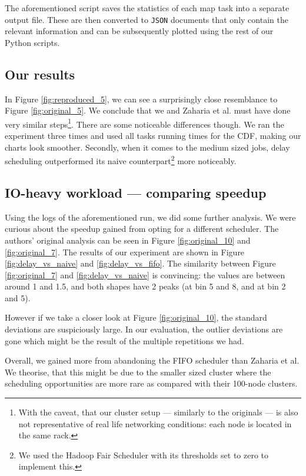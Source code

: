 The aforementioned script saves the statistics of each map task into a separate output file. These are then converted to \texttt{JSON} documents that only contain the relevant information and can be subsequently plotted using the rest of our Python scripts. 

\subsection{Our results}



In Figure \ref{fig:reproduced_5}, we can see a surprisingly close resemblance to Figure \ref{fig:original_5}. We conclude that we and Zaharia et al. \cite{ds} must have done very similar steps\footnote{With the caveat, that our cluster setup --- similarly to the originals --- is also not representative of real life networking conditions: each node is located in the same rack.}. There are some noticeable differences though. We ran the experiment three times and used all tasks running times for the CDF, making our charts look smoother. Secondly, when it comes to the medium sized jobs, delay scheduling outperformed its naive counterpart\footnote{We used the Hadoop Fair Scheduler with its thresholds set to zero to implement this.} more noticeably.

\subsection{IO-heavy workload --- comparing speedup}

Using the logs of the aforementioned run, we did some further analysis. We were curious about the speedup gained from opting for a different scheduler. The authors' original analysis can be seen in Figure \ref{fig:original_10} and \ref{fig:original_7}. The results of our experiment are shown in Figure  \ref{fig:delay_vs_naive} and \ref{fig:delay_vs_fifo}. The similarity between Figure \ref{fig:original_7} and \ref{fig:delay_vs_naive} is convincing: the values are between around 1 and 1.5, and both shapes have 2 peaks (at bin 5 and 8, and at bin 2 and 5).







However if we take a closer look at Figure \ref{fig:original_10}, the standard deviations are suspiciously large. In our evaluation, the outlier deviations are gone which might be the result of the multiple repetitions we had.

Overall, we gained more from abandoning the FIFO scheduler than Zaharia et al. We theorise, that this might be due to the smaller sized cluster where the scheduling opportunities are more rare as compared with their 100-node clusters. 

